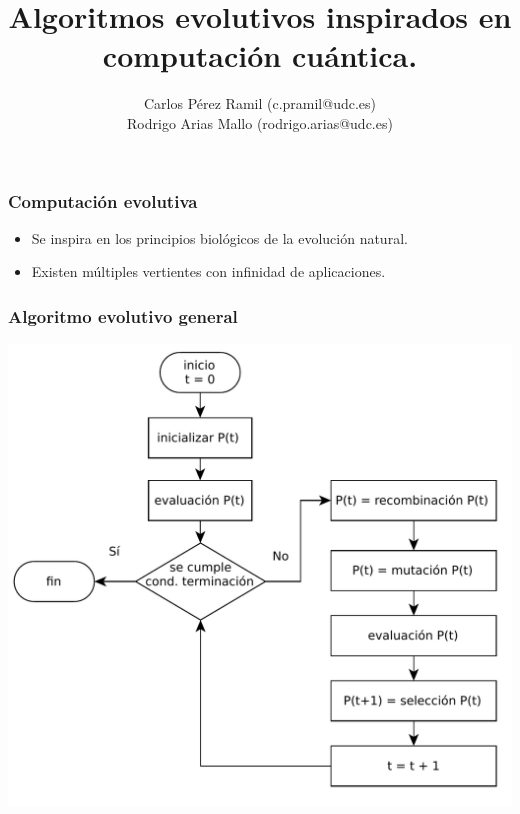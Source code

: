 \documentclass{beamer}
\title{Algoritmos evolutivos inspirados en computación cuántica.}
\author{Carlos Pérez Ramil (c.pramil@udc.es)\\
	Rodrigo Arias Mallo (rodrigo.arias@udc.es)}
\begin{document}




\frame{\titlepage}

\begin{frame}
\frametitle{Computación evolutiva}

\begin{itemize}
\item Se inspira en los principios biológicos de la evolución natural.
\item Existen múltiples vertientes con infinidad de aplicaciones.
\end{itemize}

\end{frame}
\begin{frame}
\frametitle{Algoritmo evolutivo general}

\centering
\includegraphics[scale=0.4]{EA_flowchart.pdf}

\end{frame}
\end{document}
